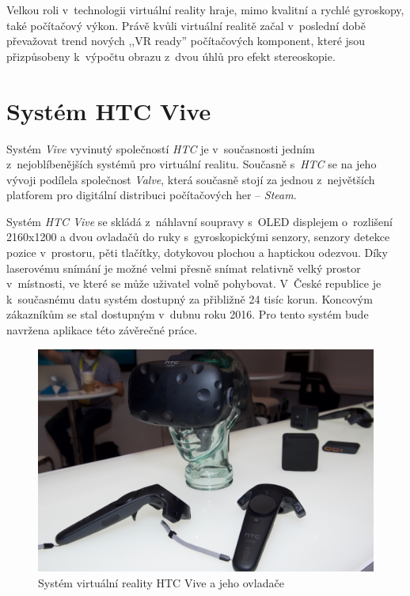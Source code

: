 Velkou roli v~technologii virtuální reality hraje, mimo kvalitní a rychlé gyroskopy,
také počítačový výkon. Právě kvůli virtuální realitě začal v~poslední
době převažovat trend nových ,,VR ready'' počítačových komponent, které jsou
přizpůsobeny k~výpočtu obrazu z~dvou úhlů pro efekt stereoskopie. \autocite{vrtech}

\section{Systém HTC Vive}\label{systuxe9m-htc-vive}

Systém \emph{Vive} vyvinutý společností \emph{HTC} je v~současnosti jedním z~nejoblíbenějších systémů pro virtuální realitu. \autocite{vivepopular} Současně
s~\emph{HTC} se na jeho vývoji podílela společnost \emph{Valve}, která současně stojí za jednou z~největších platforem pro digitální
distribuci počítačových her -- \emph{Steam}.

Systém \emph{HTC Vive} se skládá z~náhlavní soupravy s~OLED displejem
o~rozlišení 2160x1200 a dvou ovladačů do ruky s~gyroskopickými senzory,
senzory detekce pozice v~prostoru, pěti tlačítky, dotykovou plochou a
haptickou odezvou. \autocite{vivespec} Díky laserovému snímání je možné velmi přesně snímat
relativně velký prostor v~místnosti, ve které se může uživatel volně
pohybovat. V~České republice je k~současnému datu systém dostupný za
přibližně 24 tisíc korun. \autocite{viveprice} Koncovým zákazníkům se stal dostupným v~dubnu
roku 2016. Pro tento systém bude navržena aplikace této závěrečné práce.

\begin{figure}[h!]
\centering
\includegraphics[width=12cm]{src/assets/vive-pre.jpeg}
\caption{Systém virtuální reality HTC Vive a jeho ovladače\autocite{htcvivepre}}
\end{figure}

